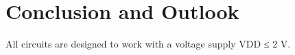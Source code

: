 \chapter{Conclusion and Outlook}
 All circuits are designed to work with a voltage
supply VDD ≤ 2 V.